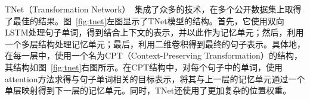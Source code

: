 TNet（Transformation Network）~\cite{Xin2018Transformation}集成了众多的技术，在多个公开数据集上取得了最佳的结果。图~\ref{fig:tnet}左图显示了TNet模型的结构。首先，它使用双向LSTM处理句子单词，得到结合上下文的表示，并以此作为记忆单元；然后，利用一个多层结构处理记忆单元；最后，利用二维卷积得到最终的句子表示。具体地，在每一层中，使用一个名为CPT（Context-Preserving Transformation）的结构，其结构如图~\ref{fig:tnet}右图所示。在CPT结构中，对每个句子中的单词，使用attention方法求得与句子单词相关的目标表示，将其与上一层的记忆单元通过一个单层映射得到下一层的记忆单元。同时，TNet还使用了更加复杂的位置权重。